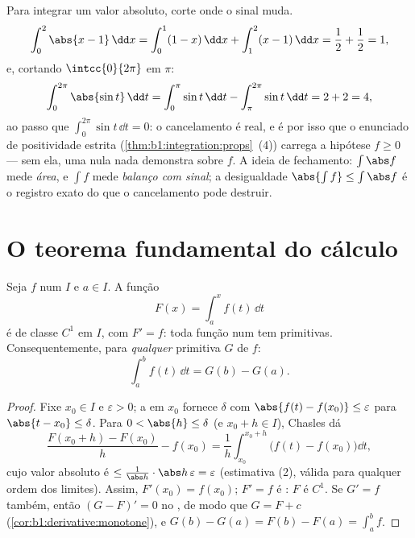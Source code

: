 \begin{example}\label{ex:b1:integration:chasleswork}
Para integrar um valor absoluto, corte onde o sinal muda.
\[
\int_0^2 \abs{x - 1}\,\dd x
= \int_0^1 (1 - x)\,\dd x + \int_1^2 (x - 1)\,\dd x
= \frac12 + \frac12 = 1 ,
\]
e, cortando $\intcc{0}{2\pi}$ em $\pi$:
\[
\int_0^{2\pi} \abs{\sin t}\,\dd t
= \int_0^{\pi} \sin t\,\dd t - \int_{\pi}^{2\pi} \sin t\,\dd t
= 2 + 2 = 4 ,
\]
ao passo que $\int_0^{2\pi} \sin t\,\dd t = 0$: o cancelamento é real,
e é por isso que o enunciado de positividade estrita
(\cref{thm:b1:integration:props}~(4)) carrega a hipótese $f
\geq 0$ --- sem ela, uma  nula nada demonstra
sobre $f$. A ideia de fechamento: $\int \abs f$ mede
\emph{área}, e $\int f$ mede \emph{balanço com sinal}; a
desigualdade $\abs{\int f} \leq \int\abs f$ é o registro exato do
que o cancelamento pode destruir.
\end{example}

\section{O teorema fundamental do cálculo}

\begin{theorem}\label{thm:b1:integration:ftc}
Seja $f$  num  $I$ e $a \in I$. A função
\[
F(x) = \int_a^x f(t)\, \dd t
\]
é de classe $C^1$ em $I$, com $F' = f$: toda função 
num  tem primitivas. Consequentemente, para \emph{qualquer}
primitiva $G$ de $f$:
\[
\int_a^b f(t)\,\dd t = G(b) - G(a) .
\]
\end{theorem}

\begin{proof}
Fixe $x_0 \in I$ e $\varepsilon > 0$; a  em $x_0$ fornece
$\delta$ com $\abs{f(t) - f(x_0)} \leq \varepsilon$ para $\abs{t -
x_0} \leq \delta$. Para $0 < \abs{h} \leq \delta$ (e $x_0 + h \in
I$), Chasles dá
\[
\frac{F(x_0 + h) - F(x_0)}{h} - f(x_0)
= \frac 1h \int_{x_0}^{x_0+h} \bigl(f(t) - f(x_0)\bigr)\dd t ,
\]
cujo valor absoluto é $\leq \frac{1}{\abs h}\cdot \abs h\,
\varepsilon = \varepsilon$ (estimativa (2), válida para qualquer ordem dos
limites). Assim, $F'(x_0) = f(x_0)$; $F' = f$ é : $F$ é
$C^1$. Se $G' = f$ também, então $(G - F)' = 0$ no , de modo que $G =
F + c$ (\cref{cor:b1:derivative:monotone}), e $G(b) - G(a) = F(b)
- F(a) = \int_a^b f$.
\end{proof}

